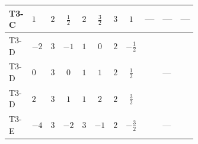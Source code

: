 \documentclass[8pt]{article}
\begin{document}
\begin{landscape}
\begin{longtable}{@{}llcccccc >{\raggedright\arraybackslash}p{0.21\linewidth} >{\raggedright\arraybackslash}p{0.21\linewidth} >{\raggedright\arraybackslash}p{0.21\linewidth}@{}}
\midrule
T3-C & $1$ & $2$ & $\frac{1}{2}$ & $2$ & $\frac{3}{2}$ & $3$ & $1$ & --- & --- & --- \\
\midrule
T3-D & $-2$ & $3$ & $-1$ & $1$ & $0$ & $2$ & $-\frac{1}{2}$ & \scriptsize\adjustbox{max width=\linewidth}{$\begin{gathered} +\frac{3 {g_2}^4}{4}\end{gathered}$} & \scriptsize\adjustbox{max width=\linewidth}{$\begin{gathered} +{g_1}^2 \left(9 {g_2}^2-\frac{3 {\lambda_{S_1}^{(1)}}}{2}-12 {\lambda_{S_1}^{(A)}}\right)\end{gathered}$} & \scriptsize\adjustbox{max width=\linewidth}{$\begin{gathered} +{g_2}^2 (-3 {\lambda_{S_1}^{(1)}}-24 {\lambda_{S_1}^{(A)}})\end{gathered}$} \\
\midrule
T3-D & $0$ & $3$ & $0$ & $1$ & $1$ & $2$ & $\frac{1}{2}$ & \scriptsize\adjustbox{max width=\linewidth}{$\begin{gathered} +\frac{3 {g_2}^4}{4}\end{gathered}$} & --- & \scriptsize\adjustbox{max width=\linewidth}{$\begin{gathered} +{g_2}^2 (-3 {\lambda_{S_1}^{(1)}}-24 {\lambda_{S_1}^{(A)}})\end{gathered}$} \\
\midrule
T3-D & $2$ & $3$ & $1$ & $1$ & $2$ & $2$ & $\frac{3}{2}$ & \scriptsize\adjustbox{max width=\linewidth}{$\begin{gathered} +\frac{3 {g_2}^4}{4}\end{gathered}$} & \scriptsize\adjustbox{max width=\linewidth}{$\begin{gathered} +{g_1}^2 \left(9 {g_2}^2-\frac{3 {\lambda_{S_1}^{(1)}}}{2}-12 {\lambda_{S_1}^{(A)}}\right)\end{gathered}$} & \scriptsize\adjustbox{max width=\linewidth}{$\begin{gathered} +{g_2}^2 (-3 {\lambda_{S_1}^{(1)}}-24 {\lambda_{S_1}^{(A)}})\end{gathered}$} \\
\midrule
T3-E & $-4$ & $3$ & $-2$ & $3$ & $-1$ & $2$ & $-\frac{3}{2}$ & \scriptsize\adjustbox{max width=\linewidth}{$\begin{gathered} +\frac{3 {g_2}^4}{4}\end{gathered}$} & --- & \scriptsize\adjustbox{max width=\linewidth}{$\begin{gathered} +{g_2}^2 (-3 {\lambda_{S_1}^{(1)}}-24 {\lambda_{S_1}^{(A)}})\end{gathered}$} \\

\end{longtable}
\end{landscape}
\end{document}
